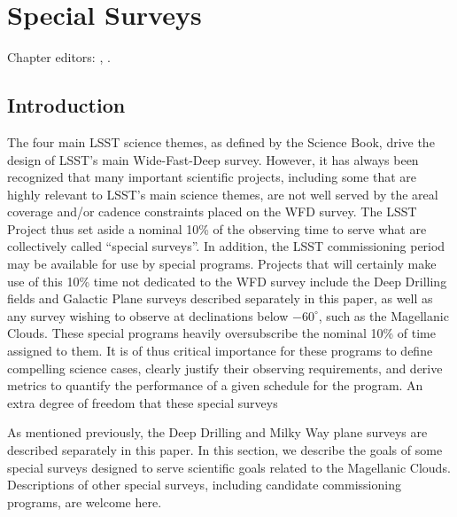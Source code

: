 \chapter[Special Surveys]{Special Surveys}
\def\chpname{specialsurveys}\label{chp:\chpname}

Chapter editors: 
,
.




\section{Introduction}
\label{sec:specials:intro}


The four main LSST science themes, as defined by the Science Book, drive the design of LSST's main Wide-Fast-Deep survey.  However, it has always been recognized that many important scientific projects, including some that are highly relevant to LSST's main science themes, are not well served by the areal coverage and/or cadence constraints placed on the WFD survey.  The LSST Project thus set aside a nominal 10\% of the observing time to serve what are collectively called ``special surveys''.  In addition, the LSST commissioning period may be available for use by special programs.  Projects that will certainly make use of this 10\% time not dedicated to the WFD survey include the Deep Drilling fields and Galactic Plane surveys described separately in this paper, as well as any survey wishing to observe at declinations below $-60^\circ$, such as the Magellanic Clouds.  These special programs heavily oversubscribe the nominal 10\% of time assigned to them.  It is of thus critical importance for these programs to define compelling science cases, clearly justify their observing requirements, and derive metrics to quantify the performance of a given schedule for the program.  An extra degree of freedom that these special surveys


As mentioned previously, the Deep Drilling and Milky Way plane surveys are described separately in this paper.  In this section, we describe the goals of some special surveys designed to serve scientific goals related to the Magellanic Clouds.  Descriptions of other special surveys, including candidate commissioning programs, are welcome here.



